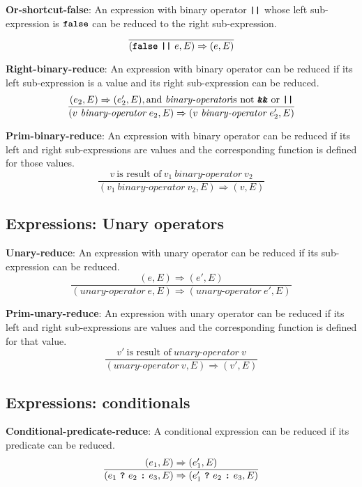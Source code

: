 \vspace{10mm}
\textbf{Or-shortcut-false}: An expression with binary operator
$\textbf{\texttt{||}}$ whose left sub-expression is
$\textbf{\texttt{false}}$ can be reduced to
the right sub-expression.
\[
\frac{
}{
  (\textbf{\texttt{false}}\  \textbf{\texttt{||}}\ e, E)
  \Rightarrow
  (e, E)
}
\]


\vspace{10mm}
\textbf{Right-binary-reduce}: An expression with binary operator
can be reduced if its left sub-expression is a value and its right
sub-expression can be reduced.
\[
\frac{
  ( e_2 , E ) \Rightarrow (e_2', E), \textrm{and}\ \textit{binary-operator}
  \mbox{is not}\ \textbf{\texttt{\&\&}}\ \textrm{or}\ \texttt{\textbf{||}}
}{
  (v\  \textit{binary-operator} \ e_2, E)
  \Rightarrow
  (v\  \textit{binary-operator} \ e_2', E)
}
\]

\vspace{10mm}
\textbf{Prim-binary-reduce}: An expression with binary operator
can be reduced if its left and right sub-expressions are values and
the corresponding function is defined for those values.
\[
\frac{
  v\ \mbox{is result of}\ v_1\  \textit{binary-operator} \ v_2
}{
  (v_1\  \textit{binary-operator} \ v_2, E)
  \Rightarrow
  (v, E)
}
\]

\subsection*{Expressions: Unary operators}

\textbf{Unary-reduce}: An expression with unary operator
can be reduced if its sub-expression can be reduced.
\[
\frac{
  ( e , E ) \Rightarrow (e', E)
}{
  (\textit{unary-operator} \ e, E)
  \Rightarrow
  (\textit{unary-operator} \ e', E)
}
\]

\vspace{10mm}
\textbf{Prim-unary-reduce}: An expression with unary operator
can be reduced if its left and right sub-expressions are values and
the corresponding function is defined for that value.
\[
\frac{
  v'\ \mbox{is result of}\ \textit{unary-operator} \ v
}{
  (\textit{unary-operator} \ v, E)
  \Rightarrow
  (v', E)
}
\]

\subsection*{Expressions: conditionals}

\textbf{Conditional-predicate-reduce}: A conditional
expression
can be reduced if its predicate can be reduced.
\[
\frac{
  ( e_1 , E ) \Rightarrow (e_1', E)
}{
  (e_1\  \textbf{\texttt{?}}\ e_2\ \textbf{\texttt{:}}\ e_3, E)
  \Rightarrow
  (e_1'\ \textbf{\texttt{?}}\ e_2\ \textbf{\texttt{:}}\ e_3, E)
}
\]

